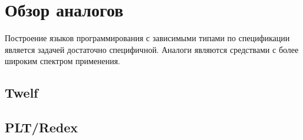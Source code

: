 \section{Обзор аналогов}
Построение языков программирования с зависимыми типами по спецификации является задачей достаточно специфичной. Аналоги являются средствами с более широким спектром применения.

\subsection{Twelf}

\subsection{PLT/Redex}





